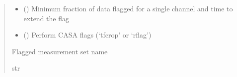 \documentclass[letterpaper,10pt,english]{sphinxmanual}
\begin{document}
\begin{fulllineitems}
\begin{quote}
\begin{description}
\begin{itemize}
\item {} 
\sphinxAtStartPar
{} () \textendash{} Minimum fraction of data flagged for a single channel and time to extend the flag

\item {} 
\sphinxAtStartPar
{} () \textendash{} Perform CASA flags (‘tfcrop’ or ‘rflag’)

\end{itemize}

\item[{Returns}] \leavevmode
\sphinxAtStartPar
Flagged measurement set name

\item[{Return type}] \leavevmode
\sphinxAtStartPar
str

\end{description}\end{quote}

\end{fulllineitems}

\end{document}
